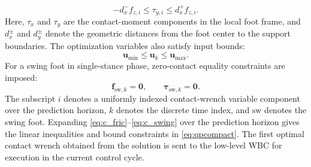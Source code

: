 \documentclass[5p,times]{elsarticle}
\begin{document}
\begin{equation}
-d_x^- f_{z,i}\le \tau_{y,i}\le d_x^+ f_{z,i}.
\label{eq:c_copy}
\end{equation}
Here, $\tau_x$ and $\tau_y$ are the contact-moment components in the local foot frame, and $d_x^\pm$ and $d_y^\pm$ denote the geometric distances from the foot center to the support boundaries. The optimization variables also satisfy input bounds:
\begin{equation}
\bm u_{\min}\le \bm u_k\le \bm u_{\max}.
\label{eq:c_bound}
\end{equation}
For a swing foot in single-stance phase, zero-contact equality constraints are imposed:
\begin{equation}
\bm f_{\text{sw},k}=\bm 0,\qquad \bm\tau_{\text{sw},k}=\bm 0.
\label{eq:c_swing}
\end{equation}
The subscript $i$ denotes a uniformly indexed contact-wrench variable component over the prediction horizon, $k$ denotes the discrete time index, and $\text{sw}$ denotes the swing foot. Expanding \eqref{eq:c_fric}--\eqref{eq:c_swing} over the prediction horizon gives the linear inequalities and bound constraints in \eqref{eq:qpcompact}. The first optimal contact wrench obtained from the solution is sent to the low-level WBC for execution in the current control cycle.
\end{document}
